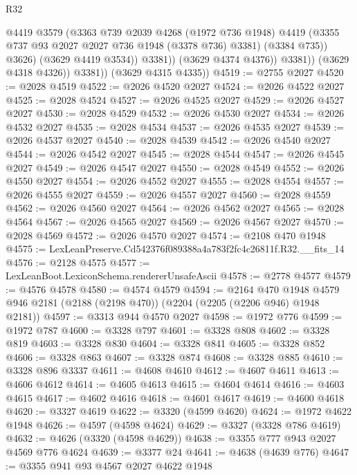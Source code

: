 \begin{lexlean}{R32}
\begin{coremodule}
                          @4419
                          @3579
                          (@3363
                            @739
                            @2039
                            @4268
                            (@1972 @736 @1948)
                            @4419
                            (@3355 @737 @93 @2027 @2027 @736 @1948 (@3378 @736) @3381)
                            (@3384 @735))
                          @3626)
                        (@3629 @4419 @3534))
                      @3381))
                  (@3629 @4374 @4376))
                @3381))
            (@3629 @4318 @4326))
          @3381))
      (@3629 @4315 @4335))
@4519 := @2755 @2027
@4520 := @2028 @4519
@4522 := @2026 @4520 @2027
@4524 := @2026 @4522 @2027
@4525 := @2028 @4524
@4527 := @2026 @4525 @2027
@4529 := @2026 @4527 @2027
@4530 := @2028 @4529
@4532 := @2026 @4530 @2027
@4534 := @2026 @4532 @2027
@4535 := @2028 @4534
@4537 := @2026 @4535 @2027
@4539 := @2026 @4537 @2027
@4540 := @2028 @4539
@4542 := @2026 @4540 @2027
@4544 := @2026 @4542 @2027
@4545 := @2028 @4544
@4547 := @2026 @4545 @2027
@4549 := @2026 @4547 @2027
@4550 := @2028 @4549
@4552 := @2026 @4550 @2027
@4554 := @2026 @4552 @2027
@4555 := @2028 @4554
@4557 := @2026 @4555 @2027
@4559 := @2026 @4557 @2027
@4560 := @2028 @4559
@4562 := @2026 @4560 @2027
@4564 := @2026 @4562 @2027
@4565 := @2028 @4564
@4567 := @2026 @4565 @2027
@4569 := @2026 @4567 @2027
@4570 := @2028 @4569
@4572 := @2026 @4570 @2027
@4574 := @2108 @470 @1948
@4575 := LexLeanPreserve.Cd542376f089388a4a783f2fc4c26811f.R32.__fits_14
@4576 := @2128 @4575
@4577 := LexLeanBoot.LexiconSchema.rendererUnsafeAscii
@4578 := @2778 @4577
@4579 := @4576 @4578
@4580 := @4574 @4579
@4594 := @2164
    @470
    @1948
    @4579
    @946
    @2181
    (@2188 (@2198 @470))
    (@2204 (@2205 (@2206 @946) @1948 @2181))
@4597 := @3313 @944 @4570 @2027
@4598 := @1972 @776
@4599 := @1972 @787
@4600 := @3328 @797
@4601 := @3328 @808
@4602 := @3328 @819
@4603 := @3328 @830
@4604 := @3328 @841
@4605 := @3328 @852
@4606 := @3328 @863
@4607 := @3328 @874
@4608 := @3328 @885
@4610 := @3328 @896 @3337
@4611 := @4608 @4610
@4612 := @4607 @4611
@4613 := @4606 @4612
@4614 := @4605 @4613
@4615 := @4604 @4614
@4616 := @4603 @4615
@4617 := @4602 @4616
@4618 := @4601 @4617
@4619 := @4600 @4618
@4620 := @3327 @4619
@4622 := @3320 (@4599 @4620)
@4624 := @1972 @4622 @1948
@4626 := @4597 (@4598 @4624)
@4629 := @3327 (@3328 @786 @4619)
@4632 := @4626 (@3320 (@4598 @4629))
@4638 := @3355 @777 @943 @2027 @4569 @776 @4624
@4639 := @3377 @24
@4641 := @4638 (@4639 @776)
@4647 := @3355 @941 @93 @4567 @2027 @4622 @1948

\end{coremodule}
\end{lexlean}
